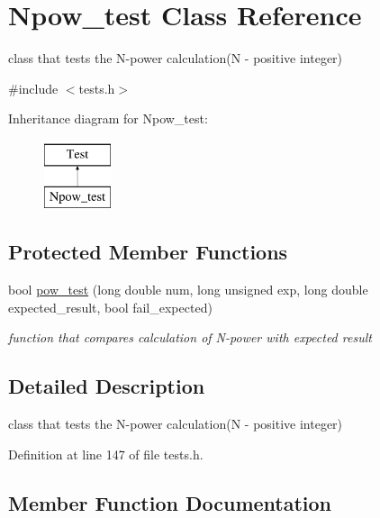 \hypertarget{class_npow__test}{}\section{Npow\+\_\+test Class Reference}
\label{class_npow__test}


class that tests the N-\/power calculation(N -\/ positive integer)  




{\ttfamily \#include $<$tests.\+h$>$}

Inheritance diagram for Npow\+\_\+test\+:\begin{figure}[H]
\begin{center}
\leavevmode
\includegraphics[height=2.000000cm]{class_npow__test}
\end{center}
\end{figure}
\subsection*{Protected Member Functions}
\begin{DoxyCompactItemize}
\item 
bool \mbox{\hyperlink{class_npow__test_a5d35f22f1c4d9af4cc9bc0556b1d68c8}{pow\+\_\+test}} (long double num, long unsigned exp, long double expected\+\_\+result, bool fail\+\_\+expected)
\begin{DoxyCompactList}\small\item\em function that compares calculation of N-\/power with expected result \end{DoxyCompactList}\end{DoxyCompactItemize}


\subsection{Detailed Description}
class that tests the N-\/power calculation(N -\/ positive integer) 

Definition at line 147 of file tests.\+h.



\subsection{Member Function Documentation}
\mbox{\label{class_npow__test_a5d35f22f1c4d9af4cc9bc0556b1d68c8}} 
